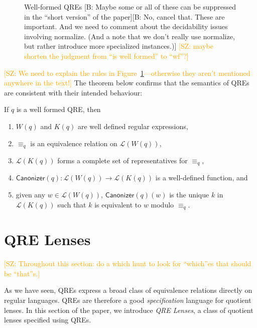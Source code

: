 \documentclass{svproc}
\newcommand{\FINISH}[3]{\ifdraft\textcolor{#1}{[#2: #3]}\fi}
\newcommand{\bcp}[1]{\FINISH{dkred}{B}{#1}}
\newcommand{\saz}[1]{\FINISH{orange}{SZ}{#1}}
\newcommand{\kw}[1]{\ensuremath{\mathsf{#1}}}
\newcommand{\canonizer}{\ensuremath{\kw{Canonizer}}}
\newcommand{\eqrel}[1]{\ensuremath{\equiv_{#1}}}
\begin{document}
\begin{figure}[p!]
\begin{prooftree}
\end{prooftree}
  \caption{Well-formed QREs \bcp{Maybe some or all of these can be
      suppressed in the ``short version'' of the paper}\bcp{No, cancel
      that.  These are important.  And we need to comment about the decidability
    issues involving normalize.  (And a note that we don't really use
    normalize, but rather introduce more specialized instances.)}
  \saz{maybe shorten the judgment from ``is well formed'' to ``wf''?}
}
  \label{fig:qrerules}
\end{figure}

\saz{We need to explain the rules in Figure~\ref{fig:qrerules}---otherwise they
  aren't mentioned anywhere in the text!}
The theorem below confirms that the semantics of QREs are consistent with their
intended behaviour:
\begin{theorem}
If $q$ is a well formed QRE, then
\begin{enumerate}
  \item $W(q)$ and $K(q)$ are well defined regular expressions,
  \item  $\eqrel{q}$ is an equivalence relation on $\mathcal{L}(W(q))$,
  \item  $\mathcal{L}(K(q))$ forms a complete set of representatives for
  $\eqrel{q}$,
  \item $\canonizer(q):\mathcal{L}(W(q)) \longrightarrow \mathcal{L}(K(q))$ is a
  well-defined function, and
  \item  given any $w \in \mathcal{L}(W(q))$, $\canonizer(q)(w)$ is the unique
  $k$ in $\mathcal{L}(K(q))$ such that $k$ is equivalent to $w$ modulo
  $\eqrel{q}$.
  \end{enumerate}
\end{theorem}

\section{QRE Lenses}
\label{QRE-lenses} 

\saz{Throughout this section: do a which hunt to look for ``which''es that
  should be ``that''s.}

As we have seen, QREs express a broad class of equivalence relations
directly on regular languages.  QREs are therefore a good \textit{specification}
language for quotient lenses. In this section of the paper, we introduce
\textit{QRE Lenses}, a class of quotient lenses specified using QREs.
\end{document}
